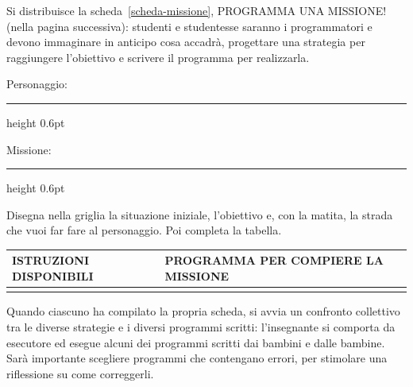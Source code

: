 Si distribuisce la scheda~\ref{scheda-missione}, PROGRAMMA UNA MISSIONE! (nella pagina successiva): studenti e studentesse saranno i programmatori e devono immaginare in anticipo cosa accadrà, progettare una strategia per raggiungere l'obiettivo e scrivere il programma per realizzarla.\label{richiamo:cap04-scheda-2c}
\begin{scheda}[C][4]
\label{scheda-missione}
Personaggio: \hrulefill\par
\vspace{5mm}
{\color{black!55}\hrule height 0.6pt}\par
\vspace{3mm}
Missione: \hrulefill\par
\vspace{5mm}
{\color{black!55}\hrule height 0.6pt}\par
\vspace{7mm}
{\fontsize{16}{21}\selectfont
Disegna nella griglia la situazione iniziale, l'obiettivo e, con la matita,
la strada che vuoi far fare al personaggio. Poi completa la tabella.\par}
\vspace{7mm}
{\centering
{}\par}
\vspace{7mm}
\begingroup
\setlength{\tabcolsep}{3mm}
\setlength{\arrayrulewidth}{0.6pt}
\renewcommand{\arraystretch}{1}
\fontsize{15}{19}\selectfont
\noindent\begin{tabular}{|p{}|p{}|}
\hline
\rowcolor{black!10}
\rule{0pt}{8mm}\textbf{ISTRUZIONI DISPONIBILI} &
\rule{0pt}{8mm}\textbf{PROGRAMMA PER COMPIERE LA MISSIONE}\rule[-3mm]{0pt}{3mm} \\
\hline
\rule{0pt}{48mm} & \\\hline
\end{tabular}\par
\endgroup
\end{scheda}

Quando ciascuno ha compilato la propria scheda, si avvia un confronto collettivo tra le diverse strategie e i diversi programmi scritti: l'insegnante si comporta da esecutore ed esegue alcuni dei programmi scritti dai bambini e dalle bambine. Sarà importante scegliere programmi che contengano errori, per stimolare una riflessione su come correggerli.

